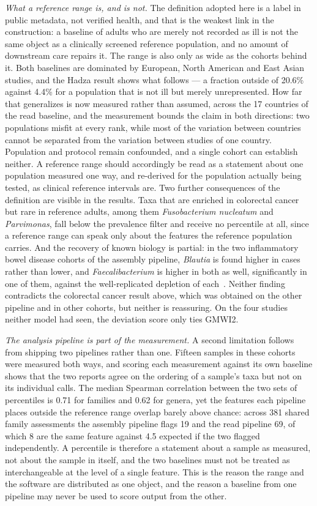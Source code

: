 \documentclass[conference]{IEEEtran}
\begin{document}
\emph{What a reference range is, and is not.} The definition adopted here is a label in public metadata, not verified health, and that is the weakest link in the construction: a baseline of adults who are merely not recorded as ill is not the same object as a clinically screened reference population, and no amount of downstream care repairs it. The range is also only as wide as the cohorts behind it. Both baselines are dominated by European, North American and East Asian studies, and the Hadza result shows what follows --- a fraction outside of 20.6\% against 4.4\% for a population that is not ill but merely unrepresented. How far that generalizes is now measured rather than assumed, across the 17 countries of the read baseline, and the measurement bounds the claim in both directions: two populations misfit at every rank, while most of the variation between countries cannot be separated from the variation between studies of one country. Population and protocol remain confounded, and a single cohort can establish neither. A reference range should accordingly be read as a statement about one population measured one way, and re-derived for the population actually being tested, as clinical reference intervals are. Two further consequences of the definition are visible in the results. Taxa that are enriched in colorectal cancer but rare in reference adults, among them \textit{Fusobacterium nucleatum} and \textit{Parvimonas}, fall below the prevalence filter and receive no percentile at all, since a reference range can speak only about the features the reference population carries. And the recovery of known biology is partial: in the two inflammatory bowel disease cohorts of the assembly pipeline, \textit{Blautia} is found higher in cases rather than lower, and \textit{Faecalibacterium} is higher in both as well, significantly in one of them, against the well-replicated depletion of each~\cite{lloydprice2019,franzosa2019}. Neither finding contradicts the colorectal cancer result above, which was obtained on the other pipeline and in other cohorts, but neither is reassuring. On the four studies neither model had seen, the deviation score only ties GMWI2.

\emph{The analysis pipeline is part of the measurement.} A second limitation follows from shipping two pipelines rather than one. Fifteen samples in these cohorts were measured both ways, and scoring each measurement against its own baseline shows that the two reports agree on the ordering of a sample's taxa but not on its individual calls. The median Spearman correlation between the two sets of percentiles is 0.71 for families and 0.62 for genera, yet the features each pipeline places outside the reference range overlap barely above chance: across 381 shared family assessments the assembly pipeline flags 19 and the read pipeline 69, of which 8 are the same feature against 4.5 expected if the two flagged independently. A percentile is therefore a statement about a sample as measured, not about the sample in itself, and the two baselines must not be treated as interchangeable at the level of a single feature. This is the reason the range and the software are distributed as one object, and the reason a baseline from one pipeline may never be used to score output from the other.
\end{document}
